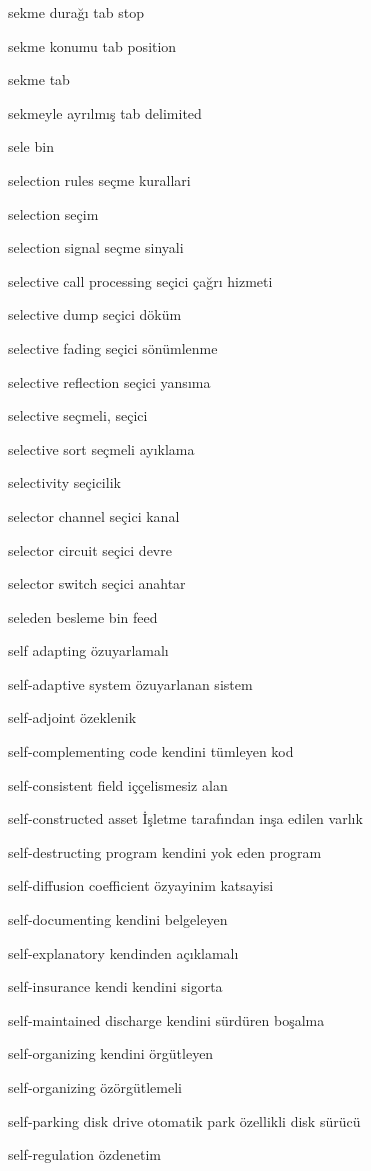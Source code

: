\documentclass[12pt,fleqn]{article}\usepackage{../../common}
\begin{document}
sekme durağı tab stop

sekme konumu tab position

sekme tab

sekmeyle ayrılmış tab delimited

sele bin

selection rules seçme kurallari

selection seçim

selection signal seçme sinyali

selective call processing seçici çağrı hizmeti

selective dump seçici döküm

selective fading seçici sönümlenme

selective reflection seçici yansıma

selective seçmeli, seçici

selective sort seçmeli ayıklama

selectivity seçicilik

selector channel seçici kanal

selector circuit seçici devre

selector switch seçici anahtar

seleden besleme bin feed

self adapting özuyarlamalı

self-adaptive system özuyarlanan sistem

self-adjoint özeklenik

self-complementing code kendini tümleyen kod

self-consistent field iççelismesiz alan

self-constructed asset İşletme tarafından inşa edilen varlık

self-destructing program kendini yok eden program

self-diffusion coefficient özyayinim katsayisi

self-documenting kendini belgeleyen

self-explanatory kendinden açıklamalı

self-insurance kendi kendini sigorta

self-maintained discharge kendini sürdüren boşalma

self-organizing kendini örgütleyen

self-organizing özörgütlemeli

self-parking disk drive otomatik park özellikli disk sürücü

self-regulation özdenetim
\end{document}
